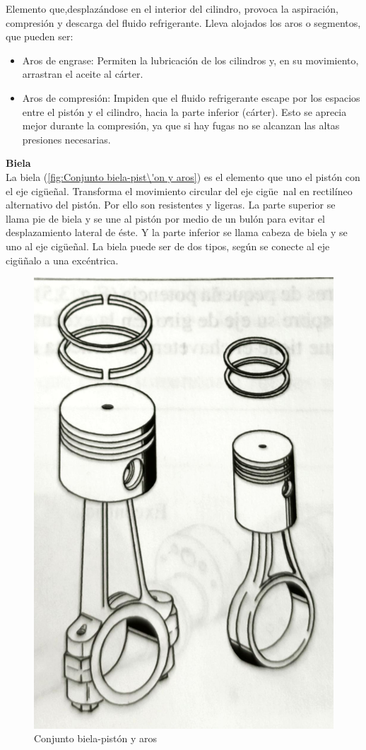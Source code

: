 Elemento que,desplaz\'andose en el interior del cilindro, provoca la aspiraci\'on, compresión y descarga del fluido refrigerante. Lleva alojados los aros o segmentos, que pueden ser:
\begin{itemize}
	\item Aros de engrase: Permiten la lubricación de los cilindros y, en su movimiento, arrastran el aceite al c\'arter.
	\item Aros de compresi\'on: Impiden que el fluido refrigerante escape por los espacios entre el pist\'on y el cilindro, hacia la parte inferior (c\'arter). Esto se aprecia mejor durante la compresi\'on, ya que si hay fugas no se alcanzan las altas presiones necesarias.
\end{itemize}
\textbf{Biela}\\
La biela (\autoref{fig:Conjunto biela-pist\'on y aros}) es el elemento que uno el pist\'on con el eje cig\"ue\~{n}al. Transforma el movimiento circular del eje cig\"ue~{n}al en rectil\'ineo alternativo del pist\'on. Por ello son resistentes y ligeras. La parte superior se llama pie de biela y se une al pist\'on por medio de un bul\'on para evitar el desplazamiento lateral de \'este. Y la parte inferior se llama cabeza de biela y se uno al eje cig\"ue\~{n}al. La biela puede ser de dos tipos, seg\'un se conecte al eje cig\"u\~{n}alo a una exc\'entrica.
\begin{figure}[H]
	\centering
	\includegraphics[width=.3\textwidth]{figuras/compresores/piston y biela.jpg}
	\caption{Conjunto biela-pist\'on y aros}
	\label{fig:Conjunto biela-pist\'on y aros}
\end{figure}


